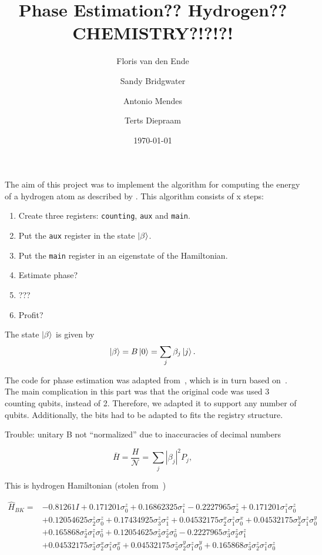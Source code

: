 \documentclass{article}
\title{Phase Estimation?? Hydrogen?? CHEMISTRY?!?!?!}
\author{Floris van den Ende\and Sandy Bridgwater\and Antonio Mendes\and Terts Diepraam}
\date{\today}
\begin{document}
\maketitle

The aim of this project was to implement the algorithm for computing the energy of a hydrogen atom as described by \textcite{poulin}. This algorithm consists of x steps:
\begin{enumerate}
	\item Create three registers: \verb|counting|, \verb|aux| and \verb|main|.
	\item Put the \verb|aux| register in the state $\ket{\beta}$.
	\item Put the \verb|main| register in an eigenstate of the Hamiltonian.
	\item Estimate phase?
	\item ???
	\item Profit?
\end{enumerate}

The state $\ket\beta$ is given by
\[ \ket\beta = B\ket 0 = \sum_j \beta_j \ket j. \]

The code for phase estimation was adapted from~\cite{Qiskit-Textbook}, which is in turn based on~\textcite{nielsen}. The main complication in this part was that the original code was used 3 counting qubits, instead of 2. Therefore, we adapted it to support any number of qubits. Additionally, the bits had to be adapted to fits the registry structure.

Trouble: unitary B not ``normalized'' due to inaccuracies of decimal numbers

\begin{equation}
	\bar H = \frac H{\mathcal{N}} = \sum_j|\beta_j|^2 P_j,
\end{equation}

This is hydrogen Hamiltonian (stolen from~\cite{seeley})

\begin{align*}
\hat{H}_{B K}=&-0.81261 I+0.171201 \sigma_{0}^{z}+0.16862325 \sigma_{1}^{z}-0.2227965 \sigma_{2}^{z}+0.171201 \sigma_{1}^{z} \sigma_{0}^{z} \\
&+0.12054625 \sigma_{2}^{z} \sigma_{0}^{z}+0.17434925 \sigma_{3}^{z} \sigma_{1}^{z}+0.04532175 \sigma_{2}^{x} \sigma_{1}^{z} \sigma_{0}^{x}+0.04532175 \sigma_{2}^{y} \sigma_{1}^{z} \sigma_{0}^{y} \\
&+0.165868 \sigma_{2}^{z} \sigma_{1}^{z} \sigma_{0}^{z}+0.12054625 \sigma_{3}^{z} \sigma_{2}^{z} \sigma_{0}^{z}-0.2227965 \sigma_{3}^{z} \sigma_{2}^{z} \sigma_{1}^{z} \\
&+0.04532175 \sigma_{3}^{z} \sigma_{2}^{x} \sigma_{1}^{z} \sigma_{0}^{x}+0.04532175 \sigma_{3}^{z} \sigma_{2}^{y} \sigma_{1}^{z} \sigma_{0}^{y}+0.165868 \sigma_{3}^{z} \sigma_{2}^{z} \sigma_{1}^{z} \sigma_{0}^{z}
\end{align*}
\end{document}
